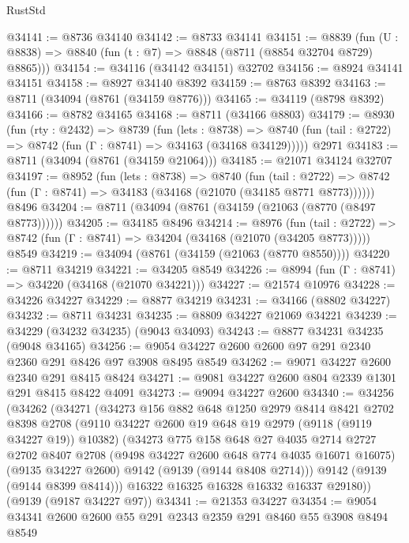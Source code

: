 \begin{lexlean}{RustStd}
\begin{coremodule}
@34141 := @8736 @34140
@34142 := @8733 @34141
@34151 := @8839
    (fun (U : @8838) => @8840 (fun (t : @7) => @8848 (@8711 (@8854 @32704 @8729) @8865)))
@34154 := @34116 (@34142 @34151) @32702
@34156 := @8924 @34141 @34151
@34158 := @8927 @34140 @8392
@34159 := @8763 @8392
@34163 := @8711 (@34094 (@8761 (@34159 @8776)))
@34165 := @34119 (@8798 @8392)
@34166 := @8782 @34165
@34168 := @8711 (@34166 @8803)
@34179 := @8930
    (fun (rty : @2432) =>
    @8739
      (fun (lets : @8738) =>
      @8740 (fun (tail : @2722) => @8742 (fun (Γ : @8741) => @34163 (@34168 @34129)))))
    @2971
@34183 := @8711 (@34094 (@8761 (@34159 @21064)))
@34185 := @21071 @34124 @32707
@34197 := @8952
    (fun (lets : @8738) =>
    @8740
      (fun (tail : @2722) =>
      @8742 (fun (Γ : @8741) => @34183 (@34168 (@21070 (@34185 @8771 @8773))))))
    @8496
@34204 := @8711 (@34094 (@8761 (@34159 (@21063 (@8770 (@8497 @8773))))))
@34205 := @34185 @8496
@34214 := @8976
    (fun (tail : @2722) => @8742 (fun (Γ : @8741) => @34204 (@34168 (@21070 (@34205 @8773)))))
    @8549
@34219 := @34094 (@8761 (@34159 (@21063 (@8770 @8550))))
@34220 := @8711 @34219
@34221 := @34205 @8549
@34226 := @8994 (fun (Γ : @8741) => @34220 (@34168 (@21070 @34221)))
@34227 := @21574 @10976
@34228 := @34226 @34227
@34229 := @8877 @34219
@34231 := @34166 (@8802 @34227)
@34232 := @8711 @34231
@34235 := @8809 @34227 @21069 @34221
@34239 := @34229 (@34232 @34235) (@9043 @34093)
@34243 := @8877 @34231 @34235 (@9048 @34165)
@34256 := @9054 @34227 @2600 @2600 @97 @291 @2340 @2360 @291 @8426 @97 @3908 @8495 @8549
@34262 := @9071 @34227 @2600 @2340 @291 @8415 @8424
@34271 := @9081 @34227 @2600 @804 @2339 @1301 @291 @8415 @8422 @4091
@34273 := @9094 @34227 @2600
@34340 := @34256
    (@34262
      (@34271
        (@34273
          @156
          @882
          @648
          @1250
          @2979
          @8414
          @8421
          @2702
          @8398
          @2708
          (@9110 @34227 @2600 @19 @648 @19 @2979 (@9118 (@9119 @34227 @19)) @10382)
          (@34273
            @775
            @158
            @648
            @27
            @4035
            @2714
            @2727
            @2702
            @8407
            @2708
            (@9498 @34227 @2600 @648 @774 @4035 @16071 @16075)
            (@9135 @34227 @2600)
            @9142
            (@9139 (@9144 @8408 @2714)))
          @9142
          (@9139 (@9144 @8399 @8414)))
        @16322
        @16325
        @16328
        @16332
        @16337
        @29180))
    (@9139 (@9187 @34227 @97))
@34341 := @21353 @34227
@34354 := @9054 @34341 @2600 @2600 @55 @291 @2343 @2359 @291 @8460 @55 @3908 @8494 @8549

\end{coremodule}
\end{lexlean}
